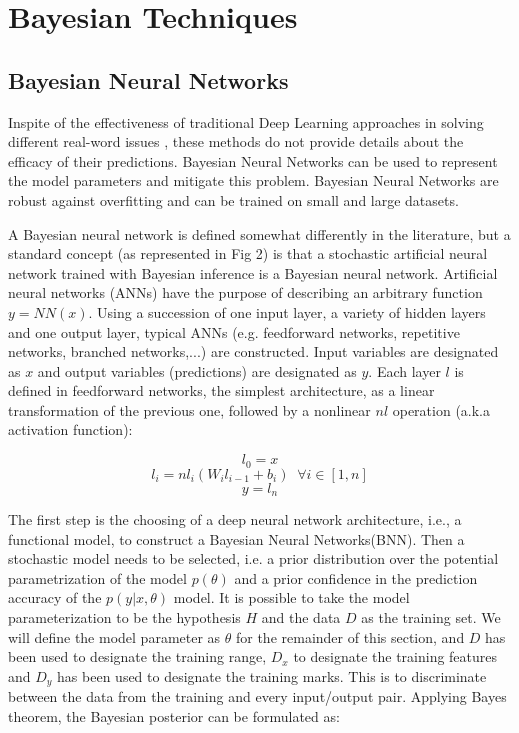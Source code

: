 \documentclass[journal]{IEEEtran}
\begin{document}
\section{Bayesian Techniques}
\subsection{Bayesian Neural Networks}

Inspite of the effectiveness of traditional Deep Learning approaches in solving different real-word issues
, these methods do not provide details about the efficacy of their predictions\cite{jospin2020hands}.
Bayesian Neural Networks can be used to represent
the model parameters and mitigate this problem.
Bayesian Neural Networks are robust against overfitting and can
be trained on small and large datasets.

A Bayesian neural network is defined somewhat differently in the literature, but a standard concept (as represented in Fig 2) is that a stochastic artificial neural network trained with Bayesian inference is a Bayesian neural network.
Artificial neural networks (ANNs) have the
purpose of describing an arbitrary function $y=NN(x)$.
Using a succession of one input layer, a variety of hidden layers and
one output layer, typical ANNs (e.g. feedforward networks, repetitive networks, branched networks,...) are constructed.  Input variables are designated as $x$ and
output variables (predictions) are designated as $y$.
Each layer $l$ is defined in feedforward networks, the simplest architecture, as a linear
transformation of the previous one, followed by a nonlinear $nl$ operation (a.k.a activation function): 

\begin{equation*}
    l_0 = x
\end{equation*}
\begin{equation*}
    l_i = nl_i(W_il_{i-1} + b_i) \; \; \forall i \in [1,n]
\end{equation*}
\begin{equation*}
    y = l_n
\end{equation*}

The first step is the choosing of a deep neural
network architecture, i.e., a functional model, to construct a Bayesian Neural Networks(BNN).
Then a stochastic model needs to be selected, i.e. a prior distribution over the potential parametrization
of the model $p(\theta)$ and a prior confidence in the prediction accuracy of the $p(y|x,\theta)$ model\cite{jospin2020hands}.
It is possible to take the model parameterization to be the
hypothesis $H$ and the data $D$ as the training set.
We will define the model parameter as $\theta$ for the remainder of this section, and  $D$ has been used to
designate the training range, $D_x$ to designate the training features and $D_y$ has been used to designate the training marks.
This is to discriminate between the data
from the training and every input/output pair. Applying Bayes theorem, the Bayesian posterior can be formulated as:
\end{document}
